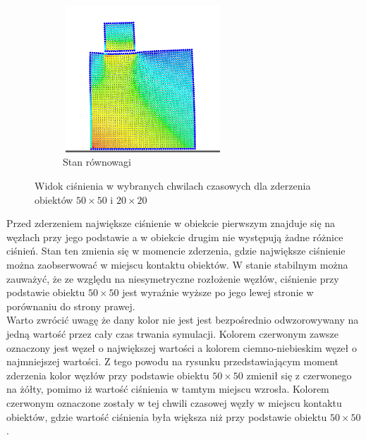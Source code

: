 \documentclass[12pt, letterpaper]{report}
\begin{document}
\begin{figure}[h]
\begin{subfigure}{0.5\textwidth}
            \centering
            \includegraphics[width=6cm, height=5.5cm]{pressure02_04}
            \caption{Stan równowagi}
        \end{subfigure}
        
        \caption{Widok ciśnienia w wybranych chwilach czasowych dla zderzenia obiektów $50 \times 50$ i $20 \times 20$}
    \end{figure}

    Przed zderzeniem największe ciśnienie w obiekcie pierwszym znajduje się na węzłach przy jego podstawie 
    a w obiekcie drugim nie występują żadne różnice ciśnień. Stan ten zmienia się w momencie zderzenia, 
    gdzie największe ciśnienie można zaobserwować w miejscu kontaktu obiektów. W stanie stabilnym 
    można zauważyć, że ze względu na niesymetryczne rozłożenie węzłów, ciśnienie przy podstawie 
    obiektu $50 \times 50$ jest wyraźnie wyższe po jego lewej stronie w porównaniu do strony prawej. \\

    Warto zwrócić uwagę że dany kolor nie jest jest bezpośrednio odwzorowywany na jedną wartość przez cały
    czas trwania symulacji. Kolorem czerwonym zawsze oznaczony jest węzeł o największej wartości a 
    kolorem ciemno-niebieskim węzeł o najmniejszej wartości. Z tego powodu na rysunku
    przedstawiającym moment zderzenia kolor węzłów przy podstawie obiektu $50 \times 50$ zmienił się z 
    czerwonego na żółty, pomimo iż wartość ciśnienia w tamtym miejscu wzrosła. Kolorem 
    czerwonym oznaczone zostały w tej chwili czasowej węzły w miejscu kontaktu obiektów, gdzie wartość 
    ciśnienia była większa niż przy podstawie obiektu $50 \times 50$.
\end{document}
